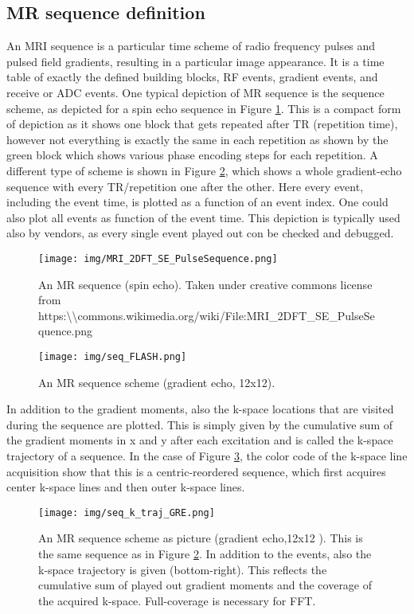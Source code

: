 \documentclass[a4paper,12pt]{extarticle}
\begin{document}
\subsection{MR sequence definition} \label{sec:MRseqdef}
An MRI sequence is a particular time scheme of radio frequency pulses and pulsed field gradients, resulting in a particular image appearance. It is a time table of exactly the defined building blocks, RF events, gradient events, and receive or ADC events. One typical depiction of MR sequence is the sequence scheme, as depicted for a spin echo sequence in Figure \ref{fig:MRsequence_SE}. This is a compact form of depiction as it shows one block that gets repeated after TR (repetition time), however not everything is exactly the same in each repetition as shown by the green block which shows various phase encoding steps for each repetition. A different type of scheme is shown in Figure \ref{fig:MRsequence_GRE}, which shows a whole gradient-echo sequence with every TR/repetition one after the other. Here every event, including the event time, is plotted as a function of an event index. One could also plot all events as function of the event time. This depiction is typically used also by vendors, as every single event played out con be checked and debugged.

\begin{figure}[!ht] 
\centering
\texttt{[image: img/MRI\_2DFT\_SE\_PulseSequence.png]}
\caption{An MR sequence (spin echo). Taken under creative commons license from https:\textbackslash\textbackslash commons.wikimedia.org/wiki/File:MRI\_2DFT\_SE\_PulseSequence.png } \label{fig:MRsequence_SE}
\end{figure}

\begin{figure}[!ht] 
\centering
\texttt{[image: img/seq\_FLASH.png]}
\caption{An MR sequence scheme (gradient echo, 12x12). }
\label{fig:MRsequence_GRE}
\end{figure}
 In addition to the gradient moments, also the k-space locations that are visited during the sequence are plotted. This is simply given by the cumulative sum of the gradient moments in x and y after each excitation and is called the k-space trajectory of a sequence. In the case of Figure \ref{fig:MRsequence_pic_GRE}, the color code of the k-space line acquisition show that this is a centric-reordered sequence, which first acquires center k-space lines and then outer k-space lines. 

\begin{figure}[!ht] 
\centering
\texttt{[image: img/seq\_k\_traj\_GRE.png]}
\caption{An MR sequence scheme as picture (gradient echo,12x12 ). This is the same sequence as in Figure \ref{fig:MRsequence_GRE}. In addition to the events, also the k-space trajectory is given (bottom-right). This reflects the cumulative sum of played out gradient moments and the coverage of the acquired k-space. Full-coverage is necessary for FFT.     } \label{fig:MRsequence_pic_GRE}
\end{figure}
\end{document}
